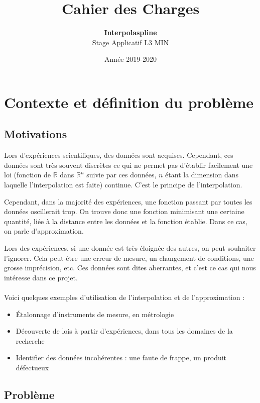 \documentclass[a4paper,12pt]{article}
\title{Cahier des Charges}
\author{\textbf{Interpolaspline}\\Stage Applicatif L3 MIN}
\date{Année 2019-2020}
\newcommand{\IKex}[2]{\mathbb{#1}^{#2}}
\newcommand{\IK}[1]{\mathbb{#1}}
\newcommand{\IRex}[1]{\IKex{R}{#1}}
\newcommand{\IR}{\IK{R}}
\begin{document}
\maketitle
\tableofcontents

\newpage

\section{Contexte et définition du problème}

\subsection{Motivations}

Lors d'expériences scientifiques, des données sont acquises. Cependant, ces données sont très souvent discrètes ce qui ne permet pas d'établir facilement une loi (fonction de $\IR$ dans $\IRex{n}$ suivie par ces données, $n$ étant la dimension dans laquelle l'interpolation est faite) continue. C'est le principe de l'interpolation.

Cependant, dans la majorité des expériences, une fonction passant par toutes les données oscillerait trop. On trouve donc une fonction minimisant une certaine quantité, liée à la distance entre les données et la fonction établie. Dans ce cas, on parle d'approximation.

Lors des expériences, si une donnée est très éloignée des autres, on peut souhaiter l'ignorer. Cela peut-être une erreur de mesure, un changement de conditions, une grosse imprécision, etc. Ces données sont dites aberrantes, et c'est ce cas qui nous intéresse dans ce projet.
\\ \\
Voici quelques exemples d'utilisation de l'interpolation et de l'approximation :
\begin{itemize}
\item Étalonnage d'instruments de mesure, en métrologie
\item Découverte de lois à partir d'expériences, dans tous les domaines de la recherche
\item Identifier des données incohérentes : une faute de frappe, un produit défectueux
\end{itemize}

\newpage
\subsection{Problème}
\end{document}
